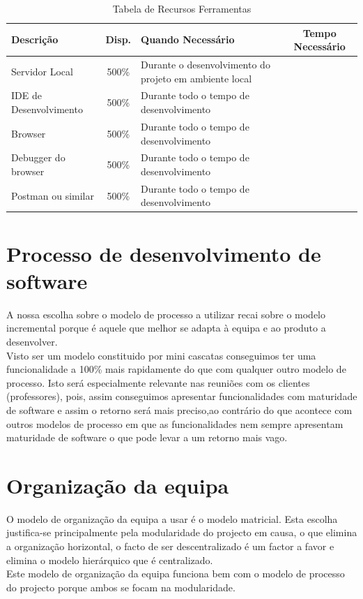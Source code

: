 \documentclass[a4paper]{report}
\begin{document}
\begin{table}[h]
\centering
\begin{tabularx}{\textwidth}{l|c|X|c}
\textbf{Descrição} & \textbf{Disp.} & \textbf{Quando Necessário} & \textbf{Tempo Necessário} \\ \hline
Servidor Local & 500\% & Durante o desenvolvimento do projeto em ambiente local &  \\ \hline
IDE de Desenvolvimento & 500\% & Durante todo o tempo de desenvolvimento &  \\ \hline
Browser & 500\% & Durante todo o tempo de desenvolvimento &  \\ \hline
Debugger do browser & 500\% & Durante todo o tempo de desenvolvimento &  \\ \hline
Postman ou similar & 500\% & Durante todo o tempo de desenvolvimento &  \\
\end{tabularx}
\caption{Tabela de Recursos Ferramentas}
\label{TabF}
\end{table}
\pagebreak
\section{Processo de desenvolvimento de software}
A nossa escolha sobre o modelo de processo a utilizar recai sobre o modelo incremental porque é aquele que melhor se adapta à equipa e ao produto a desenvolver.\\
Visto ser um modelo constituido por mini cascatas conseguimos ter uma funcionalidade a 100\% mais rapidamente do que com qualquer outro modelo de processo. Isto será especialmente relevante nas reuniões com os clientes (professores), pois, assim conseguimos apresentar funcionalidades com maturidade de software e assim o retorno será mais preciso,ao contrário do que acontece com outros modelos de processo em que as funcionalidades nem sempre apresentam maturidade de software o que pode levar a um retorno mais vago.
\section{Organização da equipa}
O modelo de organização da equipa a usar é o modelo matricial. Esta escolha justifica-se principalmente pela modularidade do projecto em causa, o que elimina a organização horizontal, o facto de ser descentralizado é um factor a favor e elimina o modelo hierárquico que é centralizado.\\
Este modelo de organização da equipa funciona bem com o modelo de processo do projecto porque ambos se focam na modularidade.
\end{document}
